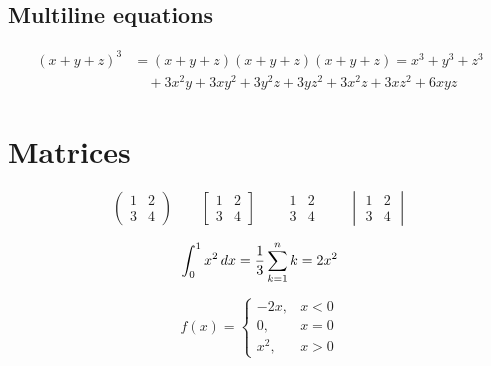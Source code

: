\documentclass [12pt,a4paper]{article}
\begin{document}
\subsection{Multiline equations}

\begin{align*}
(x+y+z)^3
&= (x+y+z)(x+y+z)(x+y+z)= x^3+y^3+z^3\\
     &\quad +3x^2y+3xy^2+3y^2z+3yz^2+3x^2z+3xz^2+6xyz
\end{align*}

\section{Matrices}


\[
\begin{pmatrix}
1 & 2\\
3 & 4
\end{pmatrix}
\qquad
\begin{bmatrix}
1 & 2\\
3 & 4
\end{bmatrix}
\qquad
\begin{matrix}
1 & 2\\
3 & 4
\end{matrix} 
\qquad
\begin{vmatrix}
1 & 2\\
3 & 4
\end{vmatrix}
\]

\begin {equation}
\int_0^1 x^2 \, dx =\frac{1}{3} \\
\sum_{k=1}^{n} k = 2 x^2 
\end{equation}

\[
 f(x)= \left \{
 \begin{array}{ll}
-2x, & x < 0 \\
0,  & x = 0 \\
x^2, & x > 0
\end{array}
\right.
\]
\end{document}
